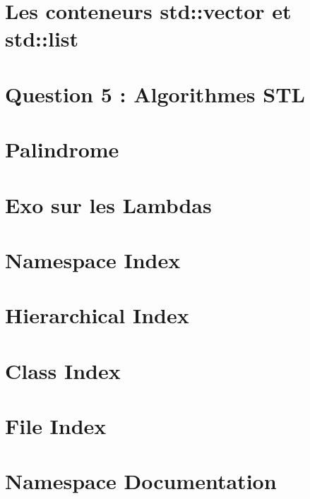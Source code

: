 \documentclass[twoside]{book}
\newcommand{\+}{\discretionary{\mbox{\scriptsize$\hookleftarrow$}}{}{}}
\begin{document}
\chapter{Les conteneurs std\+:\+:vector et std\+:\+:list}
\label{md_prog_C_vers_C_09_09_structures_donnee_it_xC3_xA9rateur_exo1_README}

\chapter{Question 5 \+: Algorithmes S\+TL}
\label{md_prog_C_vers_C_09_09_structures_donnee_it_xC3_xA9rateur_exo2_README}

\chapter{Palindrome}
\label{md_prog_C_vers_C_09_09_structures_donnee_it_xC3_xA9rateur_exo3_README}

\chapter{Exo sur les Lambdas}
\label{md_prog_C_vers_C_09_09_structures_donnee_it_xC3_xA9rateur_exo4_README}

\chapter{Namespace Index}

\chapter{Hierarchical Index}

\chapter{Class Index}

\chapter{File Index}

\chapter{Namespace Documentation}














\end{document}
